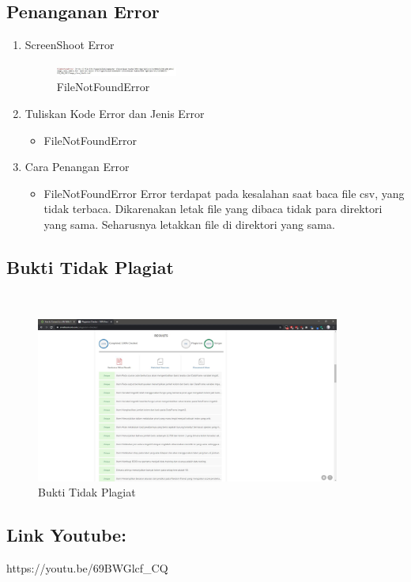 \subsection{Penanganan Error}
\begin{enumerate}
	\item ScreenShoot Error
	\begin{figure}[H]
		\includegraphics[width=4cm]{figures/1174066/3/error1.jpg}
		\centering
		\caption{FileNotFoundError}
	\end{figure}
	\item Tuliskan Kode Error dan Jenis Error
	\begin{itemize}
		\item FileNotFoundError
	\end{itemize}
	\item Cara Penangan Error
	\begin{itemize}
		\item FileNotFoundError
		\hfill\break
		Error terdapat pada kesalahan saat baca file csv, yang tidak terbaca. Dikarenakan letak file yang dibaca tidak para direktori yang sama. Seharusnya letakkan file di direktori yang sama. 
	\end{itemize}
\end{enumerate}


\subsection{Bukti Tidak Plagiat}
\hfill\\
\begin{figure}[H]
\centerline{\includegraphics[width=10cm]{figures/1174066/3/plagiat.jpg}}
\caption{Bukti Tidak Plagiat}
\label{labelgambar}
\end{figure}

\subsection{Link Youtube:}
https://youtu.be/69BWGlcf\_CQ
